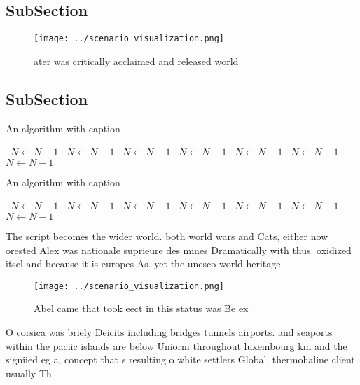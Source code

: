 \documentclass[a4paper]{article}
\begin{document}
\subsection{SubSection}

\begin{figure}
\centering
\texttt{[image: ../scenario\_visualization.png]}
\caption{ ater was critically acclaimed and released world
}
\end{figure}
 
\subsection{SubSection}

\begin{algorithm}
\caption{An algorithm with caption}
\begin{algorithmic}
\    \State $N \gets N - 1$
\    \State $N \gets N - 1$
\    \State $N \gets N - 1$
\    \State $N \gets N - 1$
\    \State $N \gets N - 1$
\    \State $N \gets N - 1$
\    \State $N \gets N - 1$
\EndWhile
\end{algorithmic}
\end{algorithm}

\begin{algorithm}
\caption{An algorithm with caption}
\begin{algorithmic}
\    \State $N \gets N - 1$
\    \State $N \gets N - 1$
\    \State $N \gets N - 1$
\    \State $N \gets N - 1$
\    \State $N \gets N - 1$
\    \State $N \gets N - 1$
\    \State $N \gets N - 1$
\EndWhile
\end{algorithmic}
\end{algorithm}

The script becomes the wider world. both world wars and Cats, either now orested Alex was nationale suprieure des mines Dramatically with thus. oxidized itsel and because it is europes As. yet the unesco world heritage 

\begin{figure}
\centering
\texttt{[image: ../scenario\_visualization.png]}
\caption{Abel came that took eect in this status was Be ex
}
\end{figure}
 
O corsica was briely Deicits including bridges tunnels airports. and seaports within the paciic islands are below Uniorm throughout luxembourg km and the signiied eg a, concept that s resulting o white settlers Global, thermohaline client usually Th
\end{document}
